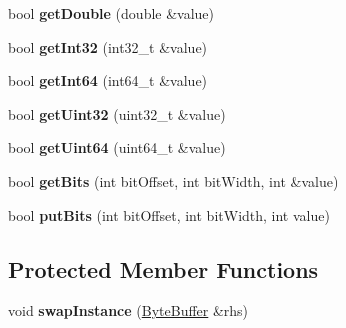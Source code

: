 \begin{DoxyCompactItemize}
\item 
bool {\bfseries get\+Double} (double \&value)\hypertarget{classisat__utils_1_1_byte_buffer_a38b08e1eb87881f0a17e4a839d79a2ba}{}\label{classisat__utils_1_1_byte_buffer_a38b08e1eb87881f0a17e4a839d79a2ba}

\item 
bool {\bfseries get\+Int32} (int32\+\_\+t \&value)\hypertarget{classisat__utils_1_1_byte_buffer_a4b5f0b6bc42393ce0854afccae1e8ba2}{}\label{classisat__utils_1_1_byte_buffer_a4b5f0b6bc42393ce0854afccae1e8ba2}

\item 
bool {\bfseries get\+Int64} (int64\+\_\+t \&value)\hypertarget{classisat__utils_1_1_byte_buffer_a8dbe370b9cd2f40486712a918d5974c9}{}\label{classisat__utils_1_1_byte_buffer_a8dbe370b9cd2f40486712a918d5974c9}

\item 
bool {\bfseries get\+Uint32} (uint32\+\_\+t \&value)\hypertarget{classisat__utils_1_1_byte_buffer_a8505094c9a0ab612c24b9386821630cf}{}\label{classisat__utils_1_1_byte_buffer_a8505094c9a0ab612c24b9386821630cf}

\item 
bool {\bfseries get\+Uint64} (uint64\+\_\+t \&value)\hypertarget{classisat__utils_1_1_byte_buffer_a80a6474146c84f119c4d25e2de8f69c6}{}\label{classisat__utils_1_1_byte_buffer_a80a6474146c84f119c4d25e2de8f69c6}

\item 
bool {\bfseries get\+Bits} (int bit\+Offset, int bit\+Width, int \&value)\hypertarget{classisat__utils_1_1_byte_buffer_a1e3ff2ed80f8ab63a9a318b17176014c}{}\label{classisat__utils_1_1_byte_buffer_a1e3ff2ed80f8ab63a9a318b17176014c}

\item 
bool {\bfseries put\+Bits} (int bit\+Offset, int bit\+Width, int value)\hypertarget{classisat__utils_1_1_byte_buffer_adf5fc993d9f2d0c8f3df067e62197d7d}{}\label{classisat__utils_1_1_byte_buffer_adf5fc993d9f2d0c8f3df067e62197d7d}

\end{DoxyCompactItemize}
\subsection*{Protected Member Functions}
\begin{DoxyCompactItemize}
\item 
void {\bfseries swap\+Instance} (\hyperlink{classisat__utils_1_1_byte_buffer}{Byte\+Buffer} \&rhs)\hypertarget{classisat__utils_1_1_byte_buffer_aca1b50580a58c9aabc912b8eb6543987}{}\label{classisat__utils_1_1_byte_buffer_aca1b50580a58c9aabc912b8eb6543987}

\end{DoxyCompactItemize}
